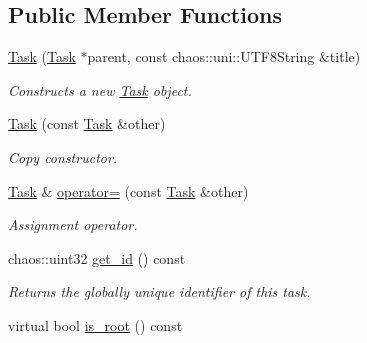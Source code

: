 \subsection*{Public Member Functions}
\begin{DoxyCompactItemize}
\item 
\hyperlink{classsigma_1_1core_1_1tasks_1_1_task_ad0c18c7b0fc306cf4fe6f133766b2779}{Task} (\hyperlink{classsigma_1_1core_1_1tasks_1_1_task}{Task} $\ast$parent, const chaos\+::uni\+::\+U\+T\+F8\+String \&title)
\begin{DoxyCompactList}\small\item\em Constructs a new \hyperlink{classsigma_1_1core_1_1tasks_1_1_task}{Task} object. \end{DoxyCompactList}\item 
\hyperlink{classsigma_1_1core_1_1tasks_1_1_task_a222255707537a07f64c687c87efef1e6}{Task} (const \hyperlink{classsigma_1_1core_1_1tasks_1_1_task}{Task} \&other)
\begin{DoxyCompactList}\small\item\em Copy constructor. \end{DoxyCompactList}\item 
\hyperlink{classsigma_1_1core_1_1tasks_1_1_task}{Task} \& \hyperlink{classsigma_1_1core_1_1tasks_1_1_task_a0d81a85b0cf3dc36a8d5a653d152075e}{operator=} (const \hyperlink{classsigma_1_1core_1_1tasks_1_1_task}{Task} \&other)
\begin{DoxyCompactList}\small\item\em Assignment operator. \end{DoxyCompactList}\item 
chaos\+::uint32 \hyperlink{classsigma_1_1core_1_1tasks_1_1_task_ae701da71b09d846ef31c5781937a79c8}{get\+\_\+id} () const 
\begin{DoxyCompactList}\small\item\em Returns the globally unique identifier of this task. \end{DoxyCompactList}\item 
\hypertarget{classsigma_1_1core_1_1tasks_1_1_task_a615ceebc720367c0b26652163118bcb9}{}virtual bool \hyperlink{classsigma_1_1core_1_1tasks_1_1_task_a615ceebc720367c0b26652163118bcb9}{is\+\_\+root} () const \label{classsigma_1_1core_1_1tasks_1_1_task_a615ceebc720367c0b26652163118bcb9}


\end{DoxyCompactItemize}
